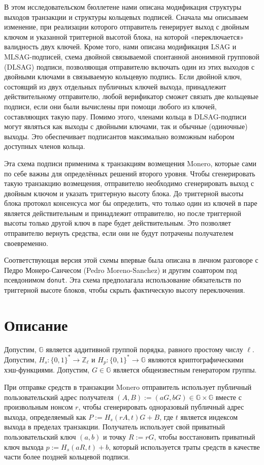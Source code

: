 \documentclass{mrl}
\begin{document}
В этом исследовательском бюллетене нами описана модификация структуры выходов транзакции и структуры кольцевых подписей. Сначала мы описываем изменение, при реализации которого отправитель генерирует выход с двойным ключом и указанной триггерной высотой блока, на которой «переключается» валидность двух ключей. Кроме того, нами описана модификация LSAG и MLSAG-подписей, схема двойной связываемой спонтанной анонимной групповой (DLSAG) подписи, позволяющая отправителю включать один из этих выходов с двойными ключами в связываемую кольцевую подпись. Если двойной ключ, состоящий из двух отдельных публичных ключей выхода, принадлежит действительному отправителю, любой верификатор сможет связать две кольцевые подписи, если они были вычислены при помощи любого из ключей, составляющих такую пару. Помимо этого, членами кольца в DLSAG-подписи могут являться как выходы с двойными ключами, так и обычные (одиночные) выходы. Это обеспечивает подписантов максимально возможным набором доступных членов кольца.

Эта схема подписи применима к транзакциям возмещения Monero, которые сами по себе важны для определённых решений второго уровня. Чтобы сгенерировать такую транзакцию возмещения, отправителю необходимо сгенерировать выход с двойным ключом и указать триггерную высоту блока. До триггерной высоты блока протокол консенсуса мог бы определить, что только один из ключей в паре является действительным и принадлежит отправителю, но после триггерной высоты только другой ключ в паре будет действительным. Это позволяет отправителю вернуть средства, если они не будут потрачены получателем своевременно.

Соответствующая версия этой схемы впервые была описана в личном разговоре с Педро Монеро-Санчесом (Pedro Moreno-Sanchez) и другим соавтором под псевдонимом \texttt{donut}. Эта схема предполагала использование обязательств по триггерной высоте блоков, чтобы скрыть фактическую высоту переключения.

\section{Описание}
Допустим, $\mathbb{G}$ является аддитивной группой порядка, равного простому числу $\ell$. Допустим, $H_s: \{0,1\}^* \to \mathbb{Z}_\ell$ и $H_p: \{0,1\}^* \to \mathbb{G}$ являются криптографическими хэш-функциями. Допустим, $G \in \mathbb{G}$ является общеизвестным генератором группы.

При отправке средств в транзакции Monero отправитель использует публичный пользовательский адрес получателя $(A,B) := (aG,bG) \in \mathbb{G} \times \mathbb{G}$ вместе с произвольным нонсом $r$, чтобы сгенерировать одноразовый публичный адрес выхода, определяемый как $P := H_s(rA,t)G + B$, где $t$ является индексом выхода в пределах транзакции. Получатель использует свой приватный пользовательский ключ $(a,b)$ и точку $R := rG$, чтобы восстановить приватный ключ выхода $p := H_s(aR,t) + b$, который используется траты средств в качестве части более поздней кольцевой подписи.
\end{document}

